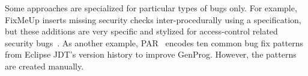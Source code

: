 
Some approaches are specialized for particular types of bugs only. For example, FixMeUp inserts missing security checks inter-procedurally using a specification, but these additions are very specific and stylized for access-control related security bugs~\cite{son2013fix}. As another example, PAR~\cite{Kim2013:PAR} encodes ten common bug fix patterns from Eclipse JDT's version history to improve GenProg. However, the patterns are created manually. 

